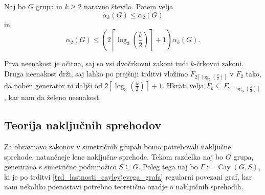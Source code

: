 \begin{posledica}\label{psl_veccrkovni_zakoni_meje}
Naj bo $G$ grupa in $k \ge 2$ naravno število. Potem velja \begin{equation*}
     \alpha_k(G) \le  \alpha_2(G) 
\end{equation*}  
in \begin{equation*}
\alpha_2(G) \le \left( {2 \left\lceil \log_3 \left(\frac{k}{2} \right) \right\rceil + 1  } \right) \alpha_k(G).
\end{equation*}  
\end{posledica}
\begin{dokaz}
    Prva neenakost je očitna, saj so vsi dvočrkovni zakoni tudi $k$-črkovni zakoni. Druga neenakost drži, saj lahko po prejšnji trditvi vložimo $F_{{2 \left\lceil \log_3(\frac{k}{2}) \right\rceil}}$ v $F_2$
    tako, da noben generator ni daljši od ${2 \left\lceil \log_3(\frac{k}{2}) \right\rceil + 1  }$. Hkrati velja $F_k \subseteq F_{{2 \left\lceil \log_3(\frac{k}{2}) \right\rceil}}$, kar nam da želeno neenakost.
\end{dokaz}


\subsection{Teorija naključnih sprehodov}

Za obravnavo zakonov v simetričnih grupah bomo potrebovali naključne sprehode, natančneje lene naključne sprehode.
Tekom razdelka naj bo $G$ grupa, generirana s simetrično podmnožico $S \subseteq G$. Poleg tega naj bo $\Gamma := \operatorname{Cay}(G, S)$, ki je po trditvi \ref{trd_lastnosti_cayleyjevega_grafa}
regularni povezani graf, kar nam nekoliko poenostavi potrebno teoretično ozadje o naključnih sprehodih.

